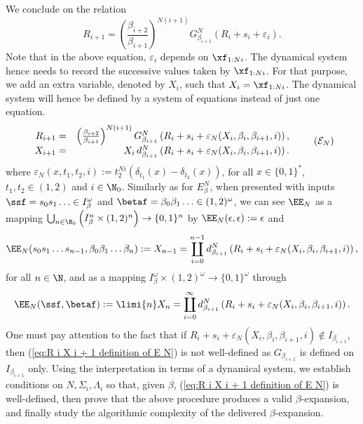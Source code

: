 We conclude on the relation
\begin{equation}
	R_{i+1} = \left(\frac{\beta_{i+2}}{\beta_{i+1}}\right)^{N(i+1)} G^N_{\beta_{i+1}}\left( R_i + s_i + \varepsilon_i\right).
\end{equation}
Note that in the above equation, $\varepsilon_i$ depends on $\xf_{1:Ni}$. The dynamical system hence needs to record the successive values taken by $\xf_{1:Ni}$. For that purpose, we add an extra variable, denoted by $X_i$, such that $X_i = \xf_{1:Ni}$. The dynamical system will hence be defined by a system of equations instead of just one equation.
\begin{equation}\label{eq:R i X i + 1 definition of E N}
	\begin{array}{rr}
		R_{i+1} =& \left(\frac{\beta_{i+2}}{\beta_{i+1}}\right)^{N(i+1)} G^N_{\beta_{i+1}}\left( R_i + s_i + \varepsilon_N(X_i, \beta_i, \beta_{i+1} , i)\right),\\
	X_{i+1} =& X_i \, d_{\beta_{i+1}}^N\left(R_i +  s_i + \varepsilon_N(X_i, \beta_i, \beta_{i+1} , i)\right).
	\end{array}
	\tag{\text{$\mathcal E_N$}}
\end{equation}
where $\varepsilon_N(x, t_1, t_2 , i) := t_2^{Ni}\left(\delta_{t_1}(x) - \delta_{t_2}(x)\right)$, for all $x \in \{0,1\}^\ast$, $t_1,t_2 \in (1,2)$ and $i \in \N_0$.
Similarly as for $E_\beta^N$, when presented with inputs $\ssf = s_0s_1\ldots \in  I_\beta^\omega$ and $\betaf = \beta_0\beta_1\ldots \in  (1,2)^\omega$, we can see $\EE_N$ as a mapping $ \bigcup_{n \in \N_0} \left(I_\beta^n \times (1,2)^n\right) \to \{0,1\}^n$ by $\EE_N(\epsilon, \epsilon) := \epsilon$ and
\begin{equation}\label{eq:inferring prefix of chunks of greedy expansion from R i E beta i}
	\EE_N(s_0s_1\ldots s_{n-1}, \beta_0\beta_1\ldots \beta_n) := X_{n-1} = \coprod_{i=0}^{n-1} d_{\beta_{i+1}}^N\left(R_i +  s_i + \varepsilon_N(X_i, \beta_i, \beta_{i+1} , i)\right), 
\end{equation}
for all $n \in \N$, and as a mapping $I_\beta^\omega \times (1,2)^\omega \to \{0,1\}^\omega$ through
\begin{equation}\label{eq:inferring chunks of greedy expansion from R i E beta i}
	\EE_N(\ssf, \betaf) := \limi{n} X_n = \coprod_{i=0}^{\infty} d_{\beta_{i+1}}^N\left(R_i +  s_i + \varepsilon_N(X_i, \beta_i, \beta_{i+1} , i)\right).
\end{equation}
One must pay attention to the fact that if $R_i + s_i + \varepsilon_N(X_i, \beta_i, \beta_{i+1} , i) \notin I_{\beta_{i+1}}$, then (\ref{eq:R i X i + 1 definition of E N}) is not well-defined as $G_{\beta_{i+1}}$ is defined on $I_{\beta_{i+1}}$ only. Using the interpretation in terms of a dynamical system, we establish conditions on $N,\Sigma_i, \Lambda_i$ so that, given $\beta$, (\ref{eq:R i X i + 1 definition of E N}) is well-defined, then prove that the above procedure produces a valid $\beta$-expansion, and finally study the algorithmic complexity of the delivered $\beta$-expansion.

